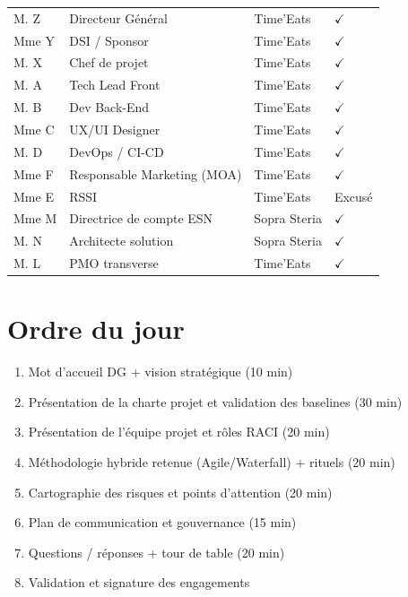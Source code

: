 \documentclass[11pt,a4paper,oneside]{report}
\begin{document}
\renewcommand{\arraystretch}{1.3}
\begin{tabularx}{\textwidth}{L{4cm} L{4cm} L{3cm} C{2cm}}
\toprule
{} &  &  &  \\
\midrule
M. Z         & Directeur Général                  & Time'Eats     & $\checkmark$ \\
Mme Y          & DSI / Sponsor                      & Time'Eats     & $\checkmark$ \\
M. X          & Chef de projet                     & Time'Eats     & $\checkmark$ \\
M. A         & Tech Lead Front                    & Time'Eats     & $\checkmark$ \\
M. B           & Dev Back-End                       & Time'Eats     & $\checkmark$ \\
Mme C        & UX/UI Designer                     & Time'Eats     & $\checkmark$ \\
M. D          & DevOps / CI-CD                     & Time'Eats     & $\checkmark$ \\
Mme F           & Responsable Marketing (MOA)        & Time'Eats     & $\checkmark$ \\
Mme E         & RSSI                               & Time'Eats     & Excusé \\
Mme M           & Directrice de compte ESN           & Sopra Steria  & $\checkmark$ \\
M. N          & Architecte solution                & Sopra Steria  & $\checkmark$ \\
M. L         & PMO transverse                     & Time'Eats     & $\checkmark$ \\
\bottomrule
\end{tabularx}

\section*{Ordre du jour}

\begin{enumerate}
  \item Mot d'accueil DG + vision stratégique (10 min)
  \item Présentation de la charte projet et validation des baselines (30 min)
  \item Présentation de l'équipe projet et rôles RACI (20 min)
  \item Méthodologie hybride retenue (Agile/Waterfall) + rituels (20 min)
  \item Cartographie des risques et points d'attention (20 min)
  \item Plan de communication et gouvernance (15 min)
  \item Questions / réponses + tour de table (20 min)
  \item Validation et signature des engagements
\end{enumerate}
\end{document}
